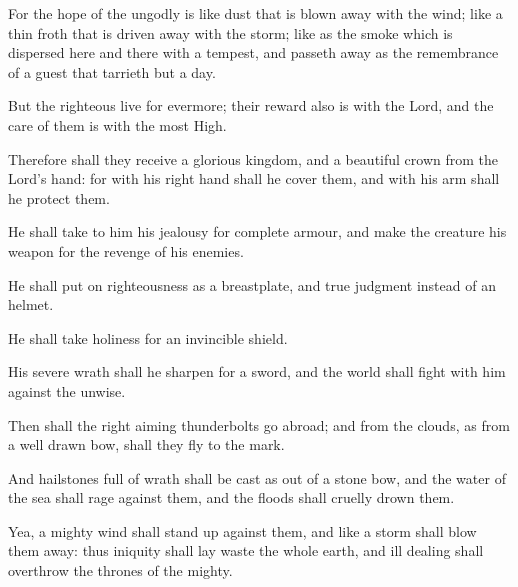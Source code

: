 {\par }{\PP {}For the hope of the ungodly is like dust that is blown away with the wind; like a thin froth that is driven away with the storm; like as the smoke which is dispersed here and there with a tempest, and passeth away as the remembrance of a guest that tarrieth but a day.
\par }{\PP {}But the righteous live for evermore; their reward also is with the Lord, and the care of them is with the most High.
\par }{\PP {}Therefore shall they receive a glorious kingdom, and a beautiful crown from the Lord’s hand: for with his right hand shall he cover them, and with his arm shall he protect them.
\par }{\PP {}He shall take to him his jealousy for complete armour, and make the creature his weapon for the revenge of his enemies.
\par }{\PP {}He shall put on righteousness as a breastplate, and true judgment instead of an helmet.
\par }{\PP {}He shall take holiness for an invincible shield.
\par }{\PP {}His severe wrath shall he sharpen for a sword, and the world shall fight with him against the unwise.
\par }{\PP {}Then shall the right aiming thunderbolts go abroad; and from the clouds, as from a well drawn bow, shall they fly to the mark.
\par }{\PP {}And hailstones full of wrath shall be cast as out of a stone bow, and the water of the sea shall rage against them, and the floods shall cruelly drown them.
\par }{\PP {}Yea, a mighty wind shall stand up against them, and like a storm shall blow them away: thus iniquity shall lay waste the whole earth, and ill dealing shall overthrow the thrones of the mighty.

}

